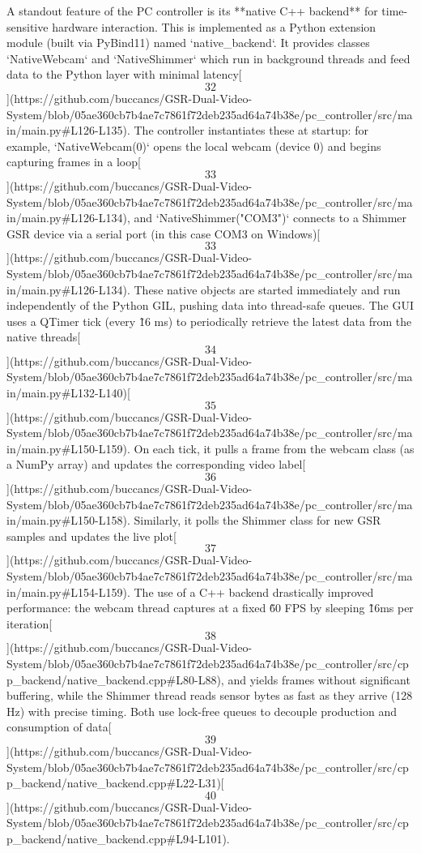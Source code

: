\documentclass[12pt,a4paper]{article}
\begin{document}
{A standout feature of the PC controller is its **native C++ backend**
for time-sensitive hardware interaction. This is implemented as a Python
extension module (built via PyBind11) named `native_backend`. It
provides classes `NativeWebcam` and `NativeShimmer` which run in
background threads and feed data to the Python layer with minimal
latency[\[32\]](https://github.com/buccancs/GSR-Dual-Video-System/blob/05ae360cb7b4ae7c7861f72deb235ad64a74b38e/pc_controller/src/main/main.py#L126-L135).
The controller instantiates these at startup: for example,
`NativeWebcam(0)` opens the local webcam (device 0) and begins capturing
frames in a
loop[\[33\]](https://github.com/buccancs/GSR-Dual-Video-System/blob/05ae360cb7b4ae7c7861f72deb235ad64a74b38e/pc_controller/src/main/main.py#L126-L134),
and `NativeShimmer("COM3")` connects to a Shimmer GSR device via a
serial port (in this case COM3 on
Windows)[\[33\]](https://github.com/buccancs/GSR-Dual-Video-System/blob/05ae360cb7b4ae7c7861f72deb235ad64a74b38e/pc_controller/src/main/main.py#L126-L134).
These native objects are started immediately and run independently of
the Python GIL, pushing data into thread-safe queues. The GUI uses a
QTimer tick (every \~16 ms) to periodically retrieve the latest data
from the native
threads[\[34\]](https://github.com/buccancs/GSR-Dual-Video-System/blob/05ae360cb7b4ae7c7861f72deb235ad64a74b38e/pc_controller/src/main/main.py#L132-L140)[\[35\]](https://github.com/buccancs/GSR-Dual-Video-System/blob/05ae360cb7b4ae7c7861f72deb235ad64a74b38e/pc_controller/src/main/main.py#L150-L159).
On each tick, it pulls a frame from the webcam class (as a NumPy array)
and updates the corresponding video
label[\[36\]](https://github.com/buccancs/GSR-Dual-Video-System/blob/05ae360cb7b4ae7c7861f72deb235ad64a74b38e/pc_controller/src/main/main.py#L150-L158).
Similarly, it polls the Shimmer class for new GSR samples and updates
the live
plot[\[37\]](https://github.com/buccancs/GSR-Dual-Video-System/blob/05ae360cb7b4ae7c7861f72deb235ad64a74b38e/pc_controller/src/main/main.py#L154-L159).
The use of a C++ backend drastically improved performance: the webcam
thread captures at a fixed \~60 FPS by sleeping \~16ms per
iteration[\[38\]](https://github.com/buccancs/GSR-Dual-Video-System/blob/05ae360cb7b4ae7c7861f72deb235ad64a74b38e/pc_controller/src/cpp_backend/native_backend.cpp#L80-L88),
and yields frames without significant buffering, while the Shimmer
thread reads sensor bytes as fast as they arrive (128 Hz) with precise
timing. Both use lock-free queues to decouple production and consumption
of
data[\[39\]](https://github.com/buccancs/GSR-Dual-Video-System/blob/05ae360cb7b4ae7c7861f72deb235ad64a74b38e/pc_controller/src/cpp_backend/native_backend.cpp#L22-L31)[\[40\]](https://github.com/buccancs/GSR-Dual-Video-System/blob/05ae360cb7b4ae7c7861f72deb235ad64a74b38e/pc_controller/src/cpp_backend/native_backend.cpp#L94-L101).
}
\end{document}
